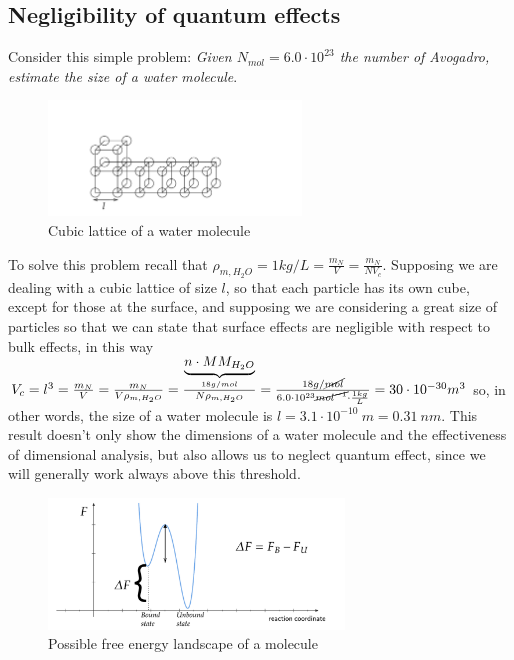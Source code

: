 \documentclass[../main/main.tex]{subfiles}
\begin{document}
\subsection{Negligibility of quantum effects}
Consider this simple problem: \emph{Given $N_{mol} = 6.0\cdot10^{23}$ the number of Avogadro, estimate the size of a water molecule}. 

\begin{figure}
    \centering
    \includegraphics[width=0.6\textwidth]{../frontespizio/tikz/1_lesson/exercise.pdf}
    \caption{Cubic lattice of a water molecule}
\end{figure}

To solve this problem recall that $\rho_{m, H_2O}=1kg/L = \frac{m_N}{V}=\frac{m_N}{NV_c}$. Supposing we are dealing with a cubic lattice of size $l$, so that each particle has its own cube, except for those at the surface, and supposing we are considering a great size of particles so that we can state that surface effects are negligible with respect to bulk effects, in this way $V_c = l^3=\frac{m_N}{V}=\frac{m_N}{V\rho_{m, H_2 O}}=\frac{\underbrace{n\cdot MM_{H_2 O}}_{18g/mol}}{N\rho_{m,H_2 O}}=\frac{18g/\cancel{mol}}{6.0\cdot10^{23}\cancel{mol^{-1}}\cdot\frac{1kg}{L}}=30\cdot10^{-30}m^3$ so, in other words, the size of a water molecule is $l=3.1\cdot 10^{-10}\:m=0.31\:nm$. 
This result doesn't only show the dimensions of a water molecule and the effectiveness of dimensional analysis, but also allows us to neglect quantum effect, since we will generally work always above this threshold.

\begin{figure}[h!]
    \centering
    \includegraphics[width=0.7\textwidth]{../frontespizio/tikz/1_lesson/free_energy.pdf}
    \caption{Possible free energy landscape of a molecule}
\end{figure}
\end{document}
